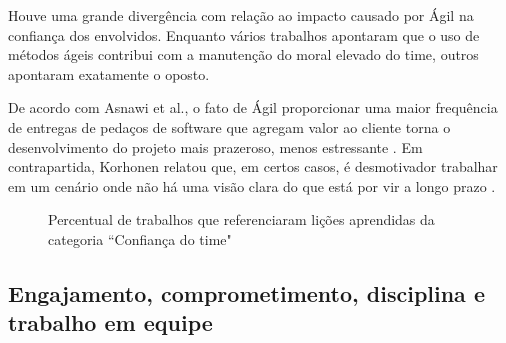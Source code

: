 Houve uma grande divergência com relação ao impacto causado por Ágil na confiança dos envolvidos. Enquanto vários trabalhos apontaram que o uso de métodos ágeis contribui com a manutenção do moral elevado do time, outros apontaram exatamente o oposto.

De acordo com Asnawi et al., o fato de Ágil proporcionar uma maior frequência de entregas de pedaços de software que agregam valor ao cliente torna o desenvolvimento do projeto mais prazeroso, menos estressante \cite{Asnawi2012}. Em contrapartida, Korhonen relatou que, em certos casos, é desmotivador trabalhar em um cenário onde não há uma visão clara do que está por vir a longo prazo \cite{Nokia2013}.

\begin{figure}[H]
	\centering
	\captionsetup{justification=centering}
	\caption{Percentual de trabalhos que referenciaram lições aprendidas da categoria ``Confiança do time"}
	\label{fig:confianca}
\end{figure}

\subsection{Engajamento, comprometimento, disciplina e trabalho em equipe}

